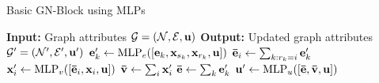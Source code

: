 \begin{algorithm}
    \caption{Basic GN-Block using MLPs}
    \label{alg:gn_block}
    \begin{algorithmic}[1]
        \State \textbf{Input:} Graph attributes $\mathcal{G} = (\mathcal{N}, \mathcal{E}, \mathbf{u})$
        \State \textbf{Output:} Updated graph attributes $\mathcal{G}' = (\mathcal{N}', \mathcal{E}', \mathbf{u}')$
            \State $\mathbf{e}_k' \gets \text{MLP}_e([\mathbf{e}_k, \mathbf{x}_{s_k}, \mathbf{x}_{r_k}, \mathbf{u}])$ 
        \EndFor
            \State $\mathbf{\bar{\mathbf{e}}}_i \gets \sum_{k: r_k = i} \mathbf{e}_k'$ 
            \State $\mathbf{x}_i' \gets \text{MLP}_v([\mathbf{\bar{\mathbf{e}}}_i, \mathbf{x}_i, \mathbf{u}])$ 
        \EndFor
        \State $\mathbf{\bar{v}} \gets \sum_{i} \mathbf{x}_i'$ 
        \State $\mathbf{\bar{\mathbf{e}}} \gets \sum_{k} \mathbf{e}_k'$
        \State $\mathbf{u}' \gets \text{MLP}_u([\mathbf{\bar{\mathbf{e}}}, \mathbf{\bar{v}}, \mathbf{u}])$ 
    \end{algorithmic}
\end{algorithm}

